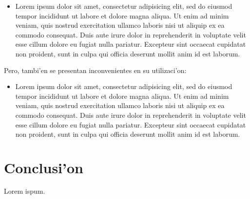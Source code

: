 \documentclass[12pt]{article}
\begin{document}
\begin{itemize}
	\item Lorem ipsum dolor sit amet, consectetur adipisicing elit, sed do eiusmod tempor
    incididunt ut labore et dolore magna aliqua. Ut enim ad minim veniam, quis nostrud
    exercitation ullamco laboris nisi ut aliquip ex ea commodo consequat. Duis aute irure
    dolor in reprehenderit in voluptate velit esse cillum dolore eu fugiat nulla pariatur.
    Excepteur sint occaecat cupidatat non proident, sunt in culpa qui officia deserunt mollit
    anim id est laborum.
\end{itemize}

Pero, tambi'en se presentan inconvenientes en su utilizaci'on:

\begin{itemize}
    \item Lorem ipsum dolor sit amet, consectetur adipisicing elit, sed do eiusmod tempor
    incididunt ut labore et dolore magna aliqua. Ut enim ad minim veniam, quis nostrud
    exercitation ullamco laboris nisi ut aliquip ex ea commodo consequat. Duis aute irure
    dolor in reprehenderit in voluptate velit esse cillum dolore eu fugiat nulla pariatur.
    Excepteur sint occaecat cupidatat non proident, sunt in culpa qui officia deserunt mollit
    anim id est laborum.
\end{itemize}

\section{Conclusi'on}
Lorem ispum.

\printbibliography
\end{document}
